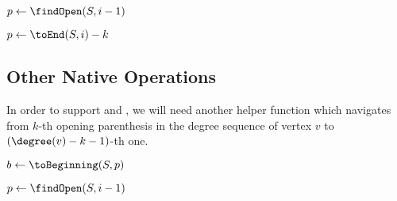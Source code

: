 \begin{algorithm}
\begin{algorithmic}
	\State $p \gets \findOpen(S, i - 1)$
	\State {}
\EndFunction
\end{algorithmic}
\end{algorithm}

\begin{algorithm}
\begin{algorithmic}
	\State $p \gets \toEnd(S, i) - k$
	\State {}
\EndFunction
\end{algorithmic}
\end{algorithm}

\subsection{Other Native Operations}

\begin{algorithm}
\begin{algorithmic}
	\State {}
\EndFunction
\end{algorithmic}
\end{algorithm}

\begin{algorithm}
\begin{algorithmic}
	\State {}
\EndFunction
\end{algorithmic}
\end{algorithm}

In order to support \dfudsRank{} and \dfudsSelect{}, we will need another helper function \toSymmetric{} which navigates from $k$-th opening parenthesis in the degree sequence of vertex $v$ to $(\degree(v) - k - 1)$-th one.

\begin{algorithm}
\begin{algorithmic}
	\State $b \gets \toBeginning(S, p)$
	\State {}
\EndFunction
\end{algorithmic}
\end{algorithm}

\begin{algorithm}
\begin{algorithmic}
		\State {}
	\Else
		\State $p \gets \findOpen(S, i - 1)$
		\State {}
	\EndIf
\EndFunction
\end{algorithmic}
\end{algorithm}


